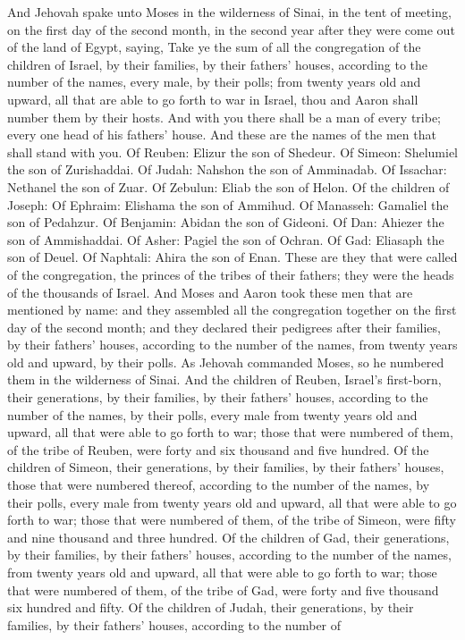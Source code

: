 


And Jehovah spake unto Moses in the wilderness of Sinai, in the tent of meeting, on the first day of the second month, in the second year after they were come out of the land of Egypt, saying, Take ye the sum of all the congregation of the children of Israel, by their families, by their fathers’ houses, according to the number of the names, every male, by their polls; from twenty years old and upward, all that are able to go forth to war in Israel, thou and Aaron shall number them by their hosts. And with you there shall be a man of every tribe; every one head of his fathers’ house. And these are the names of the men that shall stand with you. Of Reuben: Elizur the son of Shedeur. Of Simeon: Shelumiel the son of Zurishaddai. Of Judah: Nahshon the son of Amminadab. Of Issachar: Nethanel the son of Zuar. Of Zebulun: Eliab the son of Helon. Of the children of Joseph: Of Ephraim: Elishama the son of Ammihud. Of Manasseh: Gamaliel the son of Pedahzur. Of Benjamin: Abidan the son of Gideoni. Of Dan: Ahiezer the son of Ammishaddai. Of Asher: Pagiel the son of Ochran. Of Gad: Eliasaph the son of Deuel. Of Naphtali: Ahira the son of Enan. These are they that were called of the congregation, the princes of the tribes of their fathers; they were the heads of the thousands of Israel. And Moses and Aaron took these men that are mentioned by name: and they assembled all the congregation together on the first day of the second month; and they declared their pedigrees after their families, by their fathers’ houses, according to the number of the names, from twenty years old and upward, by their polls. As Jehovah commanded Moses, so he numbered them in the wilderness of Sinai.  And the children of Reuben, Israel’s first-born, their generations, by their families, by their fathers’ houses, according to the number of the names, by their polls, every male from twenty years old and upward, all that were able to go forth to war; those that were numbered of them, of the tribe of Reuben, were forty and six thousand and five hundred.  Of the children of Simeon, their generations, by their families, by their fathers’ houses, those that were numbered thereof, according to the number of the names, by their polls, every male from twenty years old and upward, all that were able to go forth to war; those that were numbered of them, of the tribe of Simeon, were fifty and nine thousand and three hundred.  Of the children of Gad, their generations, by their families, by their fathers’ houses, according to the number of the names, from twenty years old and upward, all that were able to go forth to war; those that were numbered of them, of the tribe of Gad, were forty and five thousand six hundred and fifty.  Of the children of Judah, their generations, by their families, by their fathers’ houses, according to the number of 
